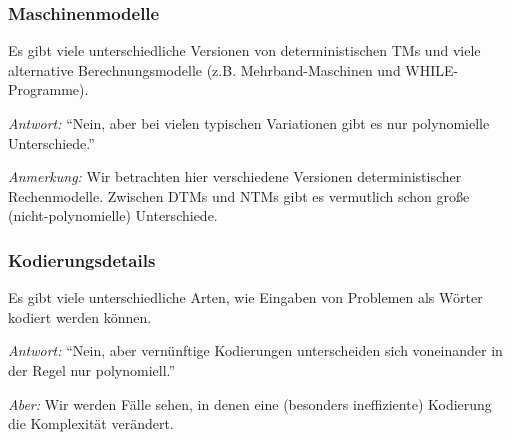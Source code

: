 \documentclass[aspectratio=1610,onlymath]{beamer}
\begin{document}
\begin{frame}\frametitle{Maschinenmodelle}

Es gibt viele unterschiedliche Versionen von deterministischen TMs und viele alternative Berechnungsmodelle (z.B. Mehrband-Maschinen und WHILE-Programme).\medskip

\bigskip\pause

\emph{Antwort:} "`Nein, aber bei vielen typischen Variationen gibt es nur polynomielle Unterschiede."'\bigskip


{\tiny \emph{Anmerkung:} Wir betrachten hier verschiedene Versionen deterministischer
Rechenmodelle. Zwischen DTMs und NTMs gibt es vermutlich
schon große (nicht-polynomielle) Unterschiede.

}

\end{frame}

\begin{frame}\frametitle{Kodierungsdetails}

Es gibt viele unterschiedliche Arten, wie Eingaben von Problemen als Wörter
kodiert werden können.\medskip

\bigskip\pause

\emph{Antwort:} "`Nein, aber vernünftige Kodierungen unterscheiden sich voneinander
in der Regel nur polynomiell."'\bigskip

\bigskip

\emph{Aber:} Wir werden Fälle sehen, in denen eine (besonders ineffiziente) Kodierung die Komplexität verändert.

\end{frame}
\end{document}
